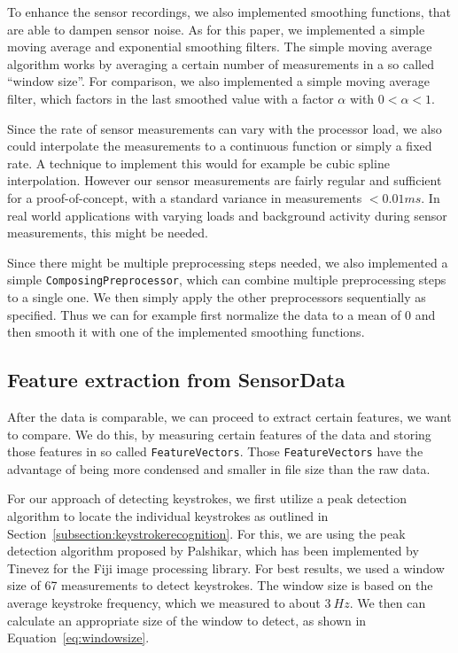 To enhance the sensor recordings, we also implemented smoothing functions, that are able to dampen sensor noise. As for this paper, we implemented a simple moving average and exponential smoothing filters. The simple moving average algorithm works by averaging a certain number of measurements in a so called ``window size''. For comparison, we also implemented a simple moving average filter, which factors in the last smoothed value with a factor $\alpha$ with $0 < \alpha < 1$.

Since the rate of sensor measurements can vary with the processor load, we also could interpolate the measurements to a continuous function or simply a fixed rate. A technique to implement this would for example be cubic spline interpolation. However our sensor measurements are fairly regular and sufficient for a proof-of-concept, with a standard variance in measurements $< 0.01ms$. In real world applications with varying loads and background activity during sensor measurements, this might be needed.

Since there might be multiple preprocessing steps needed, we also implemented a simple \lstinline$ComposingPreprocessor$, which can combine multiple preprocessing steps to a single one. We then simply apply the other preprocessors sequentially as specified. Thus we can for example first normalize the data to a mean of 0 and then smooth it with one of the implemented smoothing functions.

\subsection{Feature extraction from SensorData}\label{subsection:featureextraction}
After the data is comparable, we can proceed to extract certain features, we want to compare. We do this, by measuring certain features of the data and storing those features in so called \lstinline$FeatureVectors$. Those \lstinline$FeatureVectors$ have the advantage of being more condensed and smaller in file size than the raw data.

For our approach of detecting keystrokes, we first utilize a peak detection algorithm to locate the individual keystrokes as outlined in Section~\ref{subsection:keystrokerecognition}. For this, we are using the peak detection algorithm proposed by Palshikar, which has been implemented by Tinevez for the Fiji image processing library\cite{palshikar2009simple, tinevez2011peak}. For best results, we used a window size of 67 measurements to detect keystrokes. The window size is based on the average keystroke frequency, which we measured to about $\SI{3}{Hz}$. We then can calculate an appropriate size of the window to detect, as shown in Equation~\ref{eq:windowsize}.

